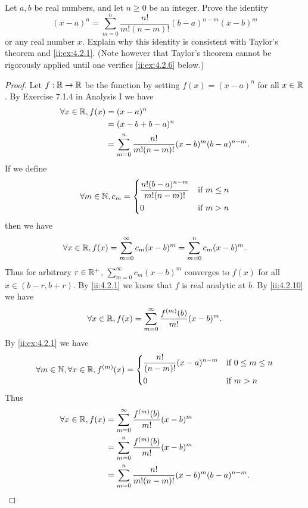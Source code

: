 \begin{ex}\label{ii:ex:4.2.5}
  Let \(a, b\) be real numbers, and let \(n \geq 0\) be an integer.
  Prove the identity
  \[
    (x - a)^n = \sum_{m = 0}^n \dfrac{n!}{m! (n - m)!} (b - a)^{n - m} (x - b)^m
  \]
  or any real number \(x\).
  Explain why this identity is consistent with Taylor's theorem and \cref{ii:ex:4.2.1}.
  (Note however that Taylor's theorem cannot be rigorously applied until one verifies \cref{ii:ex:4.2.6} below.)
\end{ex}

\begin{proof}
  Let \(f : \mathbb{R} \to \mathbb{R}\) be the function by setting \(f(x) = (x - a)^n\) for all \(x \in \mathbb{R}\).
  By Exercise 7.1.4 in Analysis I we have
  \begin{align*}
    \forall x \in \mathbb{R}, f(x) & = (x - a)^n                                                         \\
                           & = (x - b + b - a)^n                                                 \\
                           & = \sum_{m = 0}^n \dfrac{n!}{m! (n - m)!} (x - b)^m (b - a)^{n - m}.
  \end{align*}
  If we define
  \[
    \forall m \in \mathbb{N}, c_m = \begin{dcases}
      \dfrac{n! (b - a)^{n - m}}{m! (n - m)!} & \text{if } m \leq n \\
      0                                       & \text{if } m > n
    \end{dcases}
  \]
  then we have
  \[
    \forall x \in \mathbb{R}, f(x) = \sum_{m = 0}^\infty c_m (x - b)^m = \sum_{m = 0}^n c_m (x - b)^m.
  \]
  Thus for arbitrary \(r \in \mathbb{R}^+\), \(\sum_{m = 0}^\infty c_m (x - b)^m\) converges to \(f(x)\) for all \(x \in (b - r, b + r)\).
  By \cref{ii:4.2.1} we know that \(f\) is real analytic at \(b\).
  By \cref{ii:4.2.10} we have
  \begin{align*}
    \forall x \in \mathbb{R}, f(x) = \sum_{m = 0}^\infty \dfrac{f^{(m)}(b)}{m!} (x - b)^m.
  \end{align*}
  By \cref{ii:ex:4.2.1} we have
  \[
    \forall m \in \mathbb{N}, \forall x \in \mathbb{R}, f^{(m)}(x) = \begin{dcases}
      \dfrac{n!}{(n - m)!} (x - a)^{n - m} & \text{if } 0 \leq m \leq n \\
      0                                    & \text{if } m > n
    \end{dcases}
  \]
  Thus
  \begin{align*}
    \forall x \in \mathbb{R}, f(x) & = \sum_{m = 0}^\infty \dfrac{f^{(m)}(b)}{m!} (x - b)^m              \\
                           & = \sum_{m = 0}^n \dfrac{f^{(m)}(b)}{m!} (x - b)^m                   \\
                           & = \sum_{m = 0}^n \dfrac{n!}{m! (n - m)!} (x - b)^m (b - a)^{n - m}.
  \end{align*}
\end{proof}

